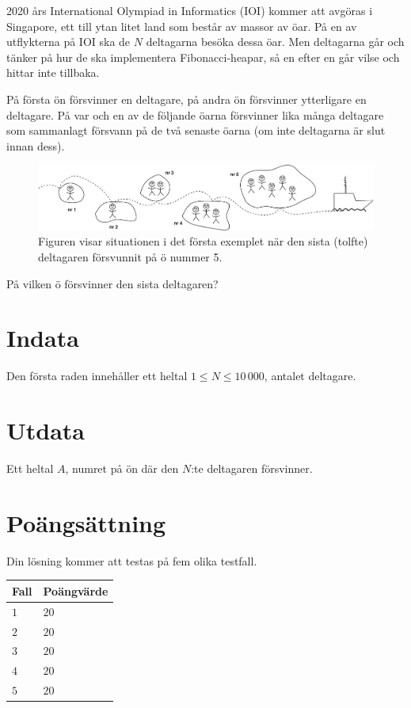 2020 års International Olympiad in Informatics (IOI) kommer att avgöras i Singapore, ett till ytan litet land som består av massor av öar. På en av utflykterna på IOI ska de $N$ deltagarna besöka dessa öar. Men deltagarna går och tänker på hur de ska implementera Fibonacci-heapar, så en efter en går vilse och hittar inte tillbaka.

På första ön försvinner en deltagare, på andra ön försvinner ytterligare en deltagare. På var och en av de följande öarna försvinner lika många deltagare som sammanlagt försvann på de två senaste öarna (om inte deltagarna är slut innan dess).

\begin{figure}[h]
  \centering
      \includegraphics[width=1.0\textwidth]{oarfig}
      \caption{Figuren visar situationen i det första exemplet när den sista (tolfte) deltagaren försvunnit på ö nummer 5.}
\end{figure}

På vilken ö försvinner den sista deltagaren?

\section*{Indata}
Den första raden innehåller ett heltal $1\le N \le 10\,000$, antalet deltagare.

\section*{Utdata}
Ett heltal $A$, numret på ön där den $N$:te deltagaren försvinner.

\section*{Poängsättning}
Din lösning kommer att testas på fem olika testfall.

\noindent
\begin{tabular}{| l | l |}
  \hline
  Fall & Poängvärde \\ \hline
  $1$    & $20$     \\ \hline 
  $2$    & $20$     \\ \hline 
  $3$ & $20$        \\ \hline
  $4$    & $20$     \\ \hline
  $5$    & $20$     \\ \hline
\end{tabular}

